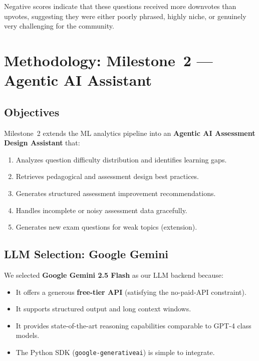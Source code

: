 \documentclass[12pt, a4paper]{article}
\begin{document}
Negative scores indicate that these questions received more downvotes than upvotes, suggesting they were either poorly phrased, highly niche, or genuinely very challenging for the community.

\section{Methodology: Milestone~2 --- Agentic AI Assistant}
\label{sec:methodology-m2}

\subsection{Objectives}

Milestone~2 extends the ML analytics pipeline into an \textbf{Agentic AI Assessment Design Assistant} that:
\begin{enumerate}[noitemsep]
    \item Analyzes question difficulty distribution and identifies learning gaps.
    \item Retrieves pedagogical and assessment design best practices.
    \item Generates structured assessment improvement recommendations.
    \item Handles incomplete or noisy assessment data gracefully.
    \item Generates new exam questions for weak topics (extension).
\end{enumerate}

\subsection{LLM Selection: Google Gemini}

We selected \textbf{Google Gemini 2.5 Flash} as our LLM backend because:
\begin{itemize}[noitemsep]
    \item It offers a generous \textbf{free-tier API} (satisfying the no-paid-API constraint).
    \item It supports structured output and long context windows.
    \item It provides state-of-the-art reasoning capabilities comparable to GPT-4 class models.
    \item The Python SDK (\texttt{google-generativeai}) is simple to integrate.
\end{itemize}
\end{document}

